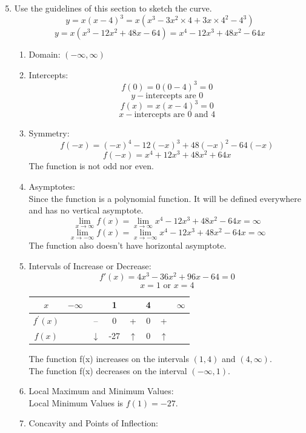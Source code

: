 \documentclass[12pt]{article}
\begin{document}
\begin{enumerate}
\setcounter{enumi}{4}
    \item Use the guidelines of this section to sketch the curve.
    \[y = x(x-4)^3 = x(x^3 - 3x^2 \times 4 + 3x \times 4^2 - 4^3)\]
    \[y = x(x^3 - 12x^2 + 48x - 64) = x^4 - 12x^3 + 48x^2 - 64x\]
    \begin{enumerate}
        \item Domain: $(-\infty, \infty)$
        \item Intercepts:
        \[f(0) = 0(0-4)^3 = 0\]
        \[y-\text{intercepts are 0}\]
        \[f(x) = x(x-4)^3 = 0\]
        \[x-\text{intercepts are 0 and 4}\]
        \item Symmetry:
        \[f(-x) = (-x)^4 - 12(-x)^3 + 48(-x)^2 - 64(-x)\]
        \[f(-x) = x^4 + 12x^3 + 48x^2 + 64x\]
        The function is not odd nor even.
        \item Asymptotes:\\
        Since the function is a polynomial function. It will be defined everywhere and has no vertical asymptote.
        \[\lim_{x \to \infty} f(x) = \lim_{x \to \infty} x^4 - 12x^3 + 48x^2 - 64x = \infty\]
        \[\lim_{x \to -\infty} f(x) = \lim_{x \to -\infty} x^4 - 12x^3 + 48x^2 - 64x = \infty\]
        The function also doesn't have horizontal asymptote.
        \item Intervals of Increase or Decrease:
        \[f'(x) = 4x^3 - 36x^2 + 96x - 64 = 0\]
        \[x = 1 \text{ or } x = 4\]
        \begin{center}
            \begin{tabular}{c c c c c c c c}
                $x$ & $-\infty$ & ~ & 1 &  & 4 & & $\infty$ \\ 
                \hline 
                $f^\prime (x)$ & & -- & 0 & + & 0 & + & \\ 
                \hline 
                $f(x)$ & ~ & $\downarrow$ & -27 & $\uparrow$ & 0 & $\uparrow$ & \\ 
            \end{tabular}    
        \end{center}
        The function f(x) increases on the intervals $(1,4)$ and $(4, \infty)$.\\
        The function f(x) decreases on the interval $(-\infty, 1)$.
        \item Local Maximum and Minimum Values:\\
        Local Minimum Values is $f(1) = -27$.
        \item Concavity and Points of Inflection:

\end{enumerate}
\end{enumerate}
\end{document}
